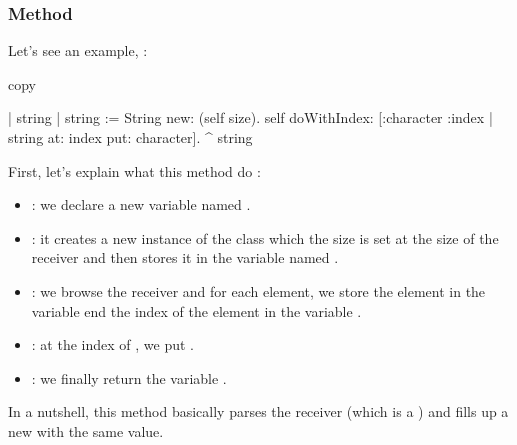 \subsubsection*{Method}
Let's see an example,  :

\begin{code}{}
copy

\tab | string |
\tab string := String new: (self size).
\tab self doWithIndex: [:character :index |
\tab \tab string at: index put: character].
\tab ^ string
\end{code}

First, let's explain what this method do :

\begin{itemize}
	\item {} : we declare a new variable named .
	\item {} : it creates a new instance of the class  which the size is set at the size of the receiver and then stores it in the variable named .
	\item \ct{self doWithIndex: [:character :index |} : we browse the receiver and for each element, we store the element in the variable  end the index of the element in the variable .
	\item {} : at the index  of , we put .
	\item {} : we finally return the variable .
\end{itemize}
In a nutshell, this method basically parses the receiver (which is a ) and fills up a new  with the same value.


